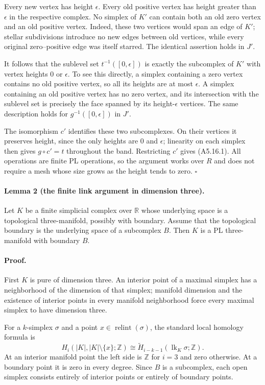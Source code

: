 Every new vertex has height $\epsilon$. Every old positive vertex has height
greater than $\epsilon$ in the respective complex. No simplex of $K'$ can
contain both an old zero vertex and an old positive vertex. Indeed, these two
vertices would span an edge of $K'$; stellar subdivisions introduce no new
edges between old vertices, while every original zero--positive edge was
itself starred. The identical assertion holds in $J'$.

It follows that the sublevel set $t^{-1}([0,\epsilon])$ is exactly the
subcomplex of $K'$ with vertex heights $0$ or $\epsilon$. To see this
directly, a simplex containing a zero vertex contains no old positive vertex,
so all its heights are at most $\epsilon$. A simplex containing an old
positive vertex has no zero vertex, and its intersection with the sublevel
set is precisely the face spanned by its height-$\epsilon$ vertices.
The same description holds for $g^{-1}([0,\epsilon])$ in $J'$.

The isomorphism $c'$ identifies these two subcomplexes. On their vertices it
preserves height, since the only heights are $0$ and $\epsilon$; linearity
on each simplex then gives $g\circ c'=t$ throughout the band. Restricting
$c'$ gives (A5.16.1). All operations are finite PL operations, so the argument
works over $R$ and does not require a mesh whose size grows as the height
tends to zero. \hfill$\square$

\paragraph{Lemma 2 (the finite link argument in dimension three).}
Let $K$ be a finite simplicial complex over $\mathbb R$ whose underlying
space is a topological three-manifold, possibly with boundary. Assume that
the topological boundary is the underlying space of a subcomplex $B$.
Then $K$ is a PL three-manifold with boundary $B$.

\paragraph{Proof.}
First $K$ is pure of dimension three. An interior point of a maximal simplex
has a neighborhood of the dimension of that simplex; manifold dimension
and the existence of interior points in every manifold neighborhood force
every maximal simplex to have dimension three.

For a $k$-simplex $\sigma$ and a point $x\in\operatorname{relint}(\sigma)$,
the standard local homology formula is
\[
 H_i(|K|,|K|\setminus\{x\};\mathbb Z)
 \cong
 \widetilde H_{i-k-1}(\operatorname{lk}_K\sigma;\mathbb Z).
 \tag{A5.16.3}
\]
At an interior manifold point the left side is $\mathbb Z$ for $i=3$ and
zero otherwise. At a boundary point it is zero in every degree. Since $B$
is a subcomplex, each open simplex consists entirely of interior points or
entirely of boundary points.

